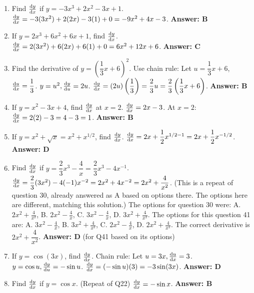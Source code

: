\begin{enumerate}[label={\arabic*.}]
  \item Find \(\frac{\mathrm{d}y}{\mathrm{d}x}\) if \(y = -3x^3 + 2x^2 - 3x + 1\).
    \(\frac{\mathrm{d}y}{\mathrm{d}x} = -3(3x^2) + 2(2x) - 3(1) + 0 = -9x^2 + 4x - 3\).
    \textbf{Answer: B}

  \item If \(y = 2x^3 + 6x^2 + 6x + 1\), find \(\frac{\mathrm{d}y}{\mathrm{d}x}\).
    \(\frac{\mathrm{d}y}{\mathrm{d}x} = 2(3x^2) + 6(2x) + 6(1) + 0 = 6x^2 + 12x + 6\).
    \textbf{Answer: C}

  \item Find the derivative of \(y = \left(\dfrac{1}{3}x + 6\right)^2\).
    Use chain rule: Let \(u = \dfrac{1}{3}x + 6\), \(\frac{\mathrm{d}u}{\mathrm{d}x} = \dfrac{1}{3}\). \(y=u^2, \frac{\mathrm{d}y}{\mathrm{d}u}=2u\).
    \(\frac{\mathrm{d}y}{\mathrm{d}x} = (2u)\left(\dfrac{1}{3}\right) = \dfrac{2}{3}u = \dfrac{2}{3}\left(\dfrac{1}{3}x + 6\right)\).
    \textbf{Answer: B}

  \item If \(y = x^2 - 3x + 4\), find \(\frac{\mathrm{d}y}{\mathrm{d}x}\) at \(x=2\).
    \(\frac{\mathrm{d}y}{\mathrm{d}x} = 2x - 3\).
    At \(x=2\): \(\frac{\mathrm{d}y}{\mathrm{d}x} = 2(2) - 3 = 4 - 3 = 1\).
    \textbf{Answer: B}

  \item If \(y = x^2 + \sqrt{x} = x^2 + x^{1/2}\), find \(\frac{\mathrm{d}y}{\mathrm{d}x}\).
    \(\frac{\mathrm{d}y}{\mathrm{d}x} = 2x + \dfrac{1}{2}x^{1/2 - 1} = 2x + \dfrac{1}{2}x^{-1/2}\).
    \textbf{Answer: D}

  \item Find \(\frac{\mathrm{d}y}{\mathrm{d}x}\) if \(y = \dfrac{2}{3}x^3 - \dfrac{4}{x} = \dfrac{2}{3}x^3 - 4x^{-1}\).
    \(\frac{\mathrm{d}y}{\mathrm{d}x} = \dfrac{2}{3}(3x^2) - 4(-1)x^{-2} = 2x^2 + 4x^{-2} = 2x^2 + \dfrac{4}{x^2}\).
    (This is a repeat of question 30, already answered as A based on options there. The options here are different, matching this solution.)
    The options for question 30 were: A. \(2x^2 + \frac{4}{x^2}\), B. \(2x^2 - \frac{4}{x}\), C. \(3x^2 - \frac{4}{x}\), D. \(3x^2 + \frac{4}{x^2}\).
    The options for this question 41 are: A. \(3x^2 - \frac{4}{x}\), B. \(3x^2 + \frac{4}{x^2}\), C. \(2x^2 - \frac{4}{x}\), D. \(2x^2 + \frac{4}{x^2}\).
    The correct derivative is \(2x^2 + \dfrac{4}{x^2}\).
    \textbf{Answer: D} (for Q41 based on its options)

  \item If \(y = \cos(3x)\), find \(\frac{\mathrm{d}y}{\mathrm{d}x}\).
    Chain rule: Let \(u=3x, \frac{\mathrm{d}u}{\mathrm{d}x}=3\). \(y=\cos u, \frac{\mathrm{d}y}{\mathrm{d}u}=-\sin u\).
    \(\frac{\mathrm{d}y}{\mathrm{d}x} = (-\sin u)(3) = -3\sin(3x)\).
    \textbf{Answer: D}

  \item Find \(\frac{\mathrm{d}y}{\mathrm{d}x}\) if \(y = \cos x\). (Repeat of Q22)
    \(\frac{\mathrm{d}y}{\mathrm{d}x} = -\sin x\).
    \textbf{Answer: B}


\end{enumerate}
